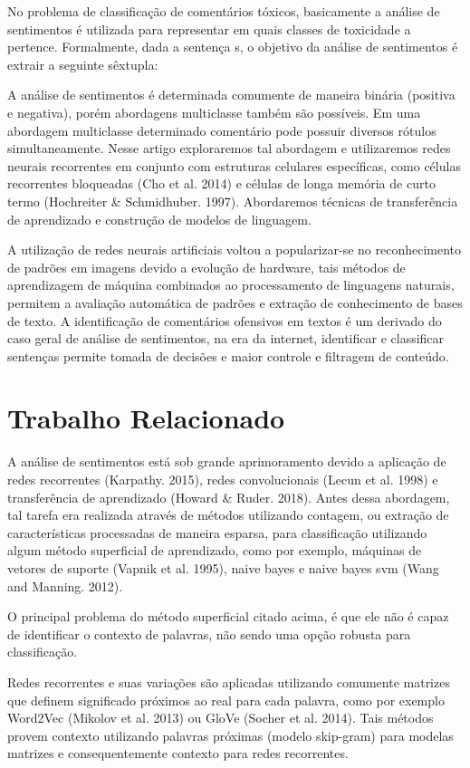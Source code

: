 \documentclass[12pt]{article}
\begin{document}
No problema de classificação de comentários tóxicos, basicamente a análise de sentimentos é utilizada para representar em quais classes de toxicidade a pertence. Formalmente, dada a sentença s, o objetivo da análise de sentimentos é extrair a seguinte sêxtupla:

A análise de sentimentos é determinada comumente de maneira binária (positiva e negativa), porém abordagens multiclasse também são possíveis. Em uma abordagem multiclasse determinado comentário pode possuir diversos rótulos simultaneamente. Nesse artigo exploraremos tal abordagem e utilizaremos redes neurais recorrentes em conjunto com estruturas celulares específicas, como células recorrentes bloqueadas (Cho et al. 2014) e células de longa memória de curto termo (Hochreiter & Schmidhuber. 1997). Abordaremos técnicas de transferência de aprendizado e construção de modelos de linguagem.

A utilização de redes neurais artificiais voltou a popularizar-se no reconhecimento de padrões em imagens devido a evolução de hardware, tais métodos de aprendizagem de máquina combinados ao processamento de linguagens naturais, permitem a avaliação automática de padrões e extração de conhecimento de bases de texto. A identificação de comentários ofensivos em textos é um derivado do caso geral de análise de sentimentos, na era da internet, identificar e classificar sentenças permite tomada de decisões e maior controle e filtragem de conteúdo. 

\section{Trabalho Relacionado} \label{sec:relacionado}

A análise de sentimentos está sob grande aprimoramento devido a aplicação de redes recorrentes (Karpathy. 2015), redes convolucionais (Lecun et al. 1998) e transferência de aprendizado (Howard & Ruder.  2018). Antes dessa abordagem, tal tarefa era realizada através de métodos utilizando contagem, ou extração de características processadas de maneira esparsa, para classificação utilizando algum método superficial de aprendizado, como por exemplo, máquinas de vetores de suporte (Vapnik et al. 1995), naive bayes e naive bayes svm (Wang and Manning. 2012).

O principal problema do método superficial citado acima, é que ele não é capaz de identificar o contexto de palavras, não sendo uma opção robusta para classificação.

Redes recorrentes e suas variações são aplicadas utilizando comumente matrizes que definem significado próximos ao real para cada palavra, como por exemplo Word2Vec (Mikolov et al. 2013) ou GloVe (Socher et al. 2014). Tais métodos provem contexto utilizando palavras próximas (modelo skip-gram) para modelas matrizes e consequentemente contexto para redes recorrentes.
\end{document}
